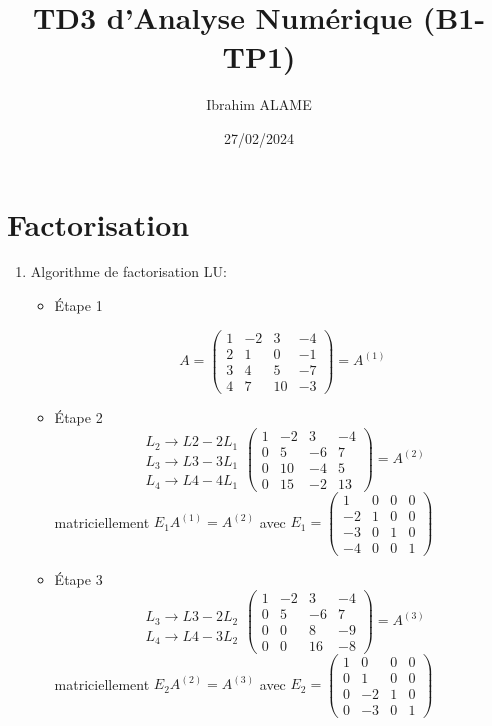 \documentclass[a4paper]{article}
\title{TD3 d'Analyse Numérique (B1-TP1) }
\author{Ibrahim ALAME}
\date{27/02/2024}
\begin{document}
\maketitle

\section{Factorisation}
\begin{enumerate}
\item Algorithme de factorisation LU:
\begin{itemize}
\item Étape 1

\[A=\left(\begin{array}{cccc}
1&-2&3&-4\\
2&1&0&-1\\
3&4&5&-7\\
4&7&10&-3
\end{array}\right)=A^{(1)}
\]
\item Étape 2
\[\begin{array}{cccc}
\\
L_2\rightarrow L2-2L_1\\
L_3\rightarrow L3-3L_1\\
L_4\rightarrow L4-4L_1
\end{array}\left(\begin{array}{cccc}
1&-2&3&-4\\
0&5&-6&7\\
0&10&-4&5\\
0&15&-2&13
\end{array}\right)=A^{(2)}
\]
matriciellement $E_1 A^{(1)}=A^{(2)}$ avec $E_1=\left(\begin{array}{cccc}
1&0&0&0\\
-2&1&0&0\\
-3&0&1&0\\
-4&0&0&1
\end{array}\right)$
\item Étape 3
\[\begin{array}{cccc}
\\
\\
L_3\rightarrow L3-2L_2\\
L_4\rightarrow L4-3L_2
\end{array}\left(\begin{array}{cccc}
1&-2&3&-4\\
0&5&-6&7\\
0&0&8&-9\\
0&0&16&-8
\end{array}\right)=A^{(3)}
\]
matriciellement $E_2 A^{(2)}=A^{(3)}$ avec $E_2=\left(\begin{array}{cccc}
1&0&0&0\\
0&1&0&0\\
0&-2&1&0\\
0&-3&0&1
\end{array}\right)$


\end{itemize}
\end{enumerate}
\end{document}
